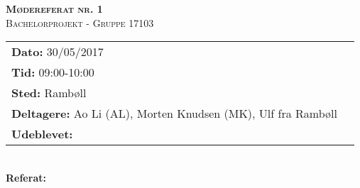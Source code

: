 
\newcommand{\HRule}{\rule{\linewidth}{0.1mm}}


	\begin{center}
		{\huge \bfseries \textsc{Mødereferat nr. 1}}\\
		\textsc{\large Bachelorprojekt - Gruppe 17103}\\[0.3cm]
	\end{center}
	\begin{tabular}{ll}
	\large \textbf{Dato:} 30/05/2017  	\\ %
	\large \textbf{Tid:}  09:00-10:00 	\\ %
	\large \textbf{Sted:} Rambøll		\\ %
	\large \textbf{Deltagere:} Ao Li (AL), Morten Knudsen (MK), Ulf fra Rambøll \\
	\large \textbf{Udeblevet:}
	\end{tabular}\\
	\phantom{\,}\hspace{0.1em} \large \textbf{Referat:}
